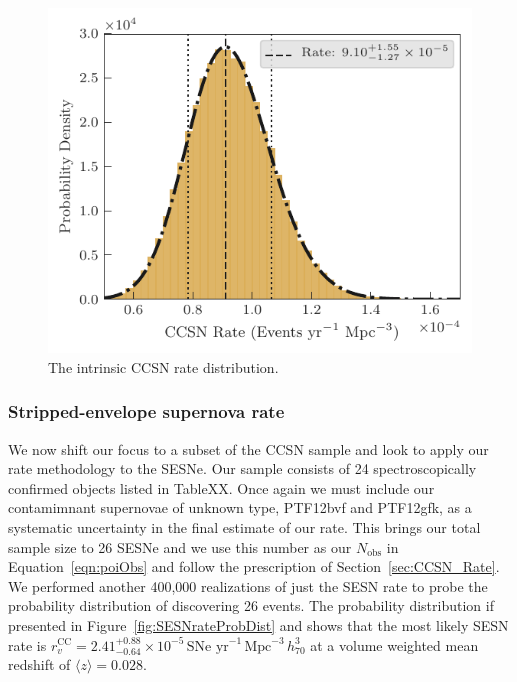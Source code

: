 \documentclass[a4paper,fleqn,usenatbib]{mnras}
\begin{document}
\begin{figure}
	\includegraphics[width=\linewidth]{./allCC_Rate.pdf}
    \caption{The intrinsic CCSN rate distribution.}
    \label{fig:ccRateDist}
\end{figure}


\subsubsection{Stripped-envelope supernova rate}
\label{SESN_Rate}

We now shift our focus to a subset of the CCSN sample and look to apply our rate methodology to the SESNe. Our sample consists of 24 spectroscopically confirmed objects listed in TableXX. Once again we must include our contamimnant supernovae of unknown type, PTF12bvf and PTF12gfk, as a systematic uncertainty in the final estimate of our rate. This brings our total sample size to 26 SESNe and we use this number as our $N_\mathrm{obs}$ in Equation~\ref{eqn:poiObs} and follow the prescription of Section~\ref{sec:CCSN_Rate}. We performed another 400,000 realizations of just the SESN rate to probe the probability distribution of discovering 26 events. The probability distribution if presented in Figure~\ref{fig:SESNrateProbDist} and shows that the most likely SESN rate is $r^\mathrm{CC}_v=2.41_{-0.64}^{+0.88}\times10^{-5}\,\text{SNe yr}^{-1}\,\text{Mpc}^{-3}\, h_{70}^{3}$ at a volume weighted mean redshift of $ \langle z \rangle = 0.028$.
\end{document}
